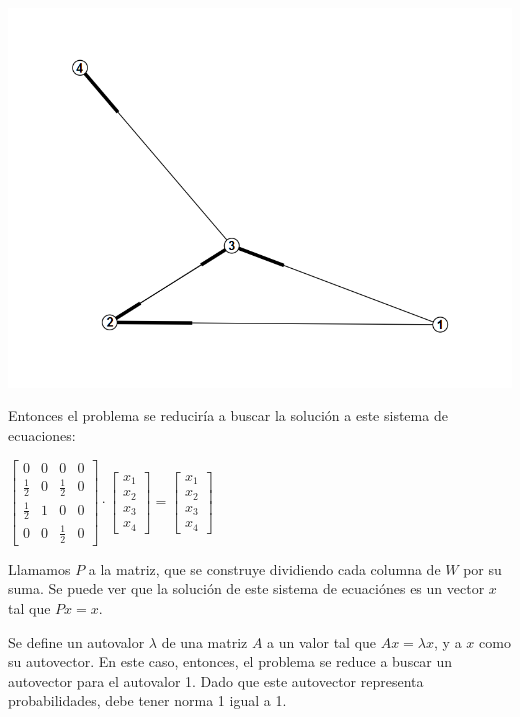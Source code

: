 \documentclass[a4paper]{article}
\begin{document}
\includegraphics[scale=0.5]{img/Grafo1.png} 

Entonces el problema se reduciría a buscar la solución a este sistema de ecuaciones:
\begin{center}
$\begin{bmatrix} 0&0&0&0\\\frac{1}{2}&0&\frac{1}{2}&0\\\frac{1}{2}&1&0&0\\0&0&\frac{1}{2}&0\end{bmatrix} \cdot \begin{bmatrix} x_1\\x_2\\x_3\\x_4 \end{bmatrix} = \begin{bmatrix} x_1\\x_2\\x_3\\x_4 \end{bmatrix}$
\end{center}
Llamamos $P$ a la matriz, que se construye dividiendo cada columna de $W$ por su suma. Se puede ver que la solución de este sistema de ecuaciónes es un vector $x$ tal que $Px=x$.

Se define un autovalor $\lambda$ de una matriz $A$ a un valor tal que $Ax=\lambda x$, y a $x$ como su autovector. En este caso, entonces, el problema se reduce a buscar un autovector para el autovalor 1. Dado que este autovector representa probabilidades, debe tener norma 1 igual a 1.
\end{document}
